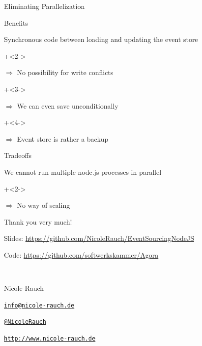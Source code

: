 \begin{frame}[fragile]{Eliminating Parallelization}
\begin{center}
\end{center}

\end{frame}


\begin{frame}[fragile]{Benefits}

Synchronous code between loading and updating the event store

\onslide+<2->
\vspace{2em}

$\Longrightarrow$ No possibility for write conflicts

\onslide+<3->
\vspace{2em}

$\Longrightarrow$ We can even save unconditionally

\onslide+<4->
\vspace{2em}

$\Longrightarrow$ Event store is rather a backup

\end{frame}

\begin{frame}[fragile]{Tradeoffs}

We cannot run multiple node.js processes in parallel

\onslide+<2->
\vspace{2em}

$\Longrightarrow$ No way of scaling

\end{frame}


\begin{frame}{Thank you very much!}

        Slides: \url{https://github.com/NicoleRauch/EventSourcingNodeJS} 
        \vspace{1em}

        Code: \url{https://github.com/softwerkskammer/Agora}
        
        ~\\[1em]
        \begin{block}{Nicole Rauch}
        \begin{description}[Twitterxx]
                \item[E-Mail]  \href{mailto:info@nicole-rauch.de}{\texttt{info@nicole-rauch.de}}
                \item[Twitter] \href{http://twitter.com/NicoleRauch}{\texttt{@NicoleRauch}}
                \item[Web] \href{http://www.nicole-rauch.de}{\texttt{http://www.nicole-rauch.de}}
        \end{description}
        \end{block}
\end{frame}

